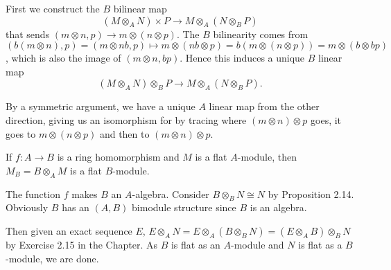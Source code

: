 \documentclass[a4paper]{exam}
\begin{document}
\begin{questions}
\begin{solution}
		First we construct the $B$ bilinear map
		\[
			(M \otimes _A N) \times P \to M \otimes _A (N \otimes _B P)
		\]
		that sends $(m \otimes n, p) \to m \otimes (n \otimes p)$.
		The $B$ bilinearity comes from $(b(m \otimes n),p) = (m \otimes nb,p) \mapsto m \otimes (nb \otimes p) = b(m \otimes (n \otimes p)) = m \otimes (b \otimes bp) $, which is also the image of $(m \otimes n, bp)$.
		Hence this induces a unique $B$ linear map
		\[
			(M \otimes_A N) \otimes_B P \to M \otimes _A (N \otimes _B P)
		.\]

		By a symmetric argument, we have a unique $A$ linear map from the other direction, giving us an isomorphism for by tracing where $(m \otimes n) \otimes p$ goes, it goes to $m \otimes (n \otimes p)$ and then to $(m \otimes n) \otimes p$.
	\end{solution}

	\question If $f: A\to B$ is a ring homomorphism and $M$ is a flat $A$-module, then $M_B = B \otimes _A M$ is a flat $B$-module.
	\begin{solution}
		The function $f$ makes $B$ an $A$-algebra.
		Consider $B \otimes_B N \cong N$ by Proposition 2.14.
		Obviously $B$ has an $(A,B)$ bimodule structure since $B$ is an algebra.

		Then given an exact sequence $E $, $E \otimes_A N = E \otimes_A (B \otimes_B N) = (E \otimes_A B) \otimes_B N$ by Exercise 2.15 in the Chapter.
		As $B$ is flat as an $A$-module and $N$ is flat as a $B$-module, we are done.
	\end{solution}
\end{questions}
\end{document}
